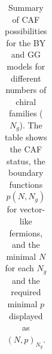 \begin{table}[ht]
\begin{tabularx}{\textwidth}{@{}ccc >{\centering\arraybackslash}X >{\centering\arraybackslash}m{1.8cm} @{}}


\bottomrule
\end{tabularx}
\caption{Summary of CAF possibilities for the BY and GG models for different numbers of chiral families ($N_g$). The table shows the CAF status, the boundary functions $p(N,N_g)$ for vector-like fermions, and the minimal $N$ for each $N_g$ and the required minimal $p$ displayed as $(N,p)_{N_g}$. \label{tab:conc_part2}}
\end{table}
